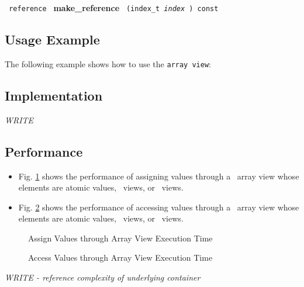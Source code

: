 \noindent
\texttt{%
reference
}
\newline
\textbf{make\_reference}%
\texttt{%
(index\_t
\textit{index}%
) const
}

\subsection{Usage Example} \label{sec-ary-vw-use}

The following example shows how to use the \texttt{array view}:


\subsection{Implementation} \label{sec-ary-vw-impl}

\textit{WRITE}

\subsection{Performance} \label{sec-ary-vw-perf}

\begin{itemize}
\item
Fig. \ref{fig:ary-vw-assign-exper}
shows the performance of assigning values through a \stapl\ array view
whose elements are atomic values, \stl\ views, or \stapl\ views.
\item
Fig. \ref{fig:ary-vw-access-exper}
shows the performance of accessing values through a \stapl\ array view
whose elements are atomic values, \stl\ views, or \stapl\ views.
\end{itemize}

\begin{figure}[p]
\caption{Assign Values through Array View Execution Time}
\label{fig:ary-vw-assign-exper}
\end{figure}

\begin{figure}[p]
\caption{Access Values through Array View Execution Time}
\label{fig:ary-vw-access-exper}
\end{figure}

\emph{WRITE - reference complexity of underlying container}

